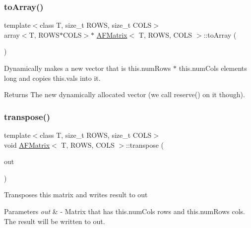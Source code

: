 \subsubsection{\texorpdfstring{to\+Array()}{toArray()}}
{\footnotesize\ttfamily template$<$class T, size\+\_\+t R\+O\+WS, size\+\_\+t C\+O\+LS$>$ \\
array$<$T, R\+O\+WS$\ast$C\+O\+LS$>$$\ast$ \hyperlink{class_a_f_matrix}{A\+F\+Matrix}$<$ T, R\+O\+WS, C\+O\+LS $>$\+::to\+Array (\begin{DoxyParamCaption}{ }\end{DoxyParamCaption})\hspace{0.3cm}{\ttfamily [inline]}}

Dynamically makes a new vector that is {\ttfamily this.\+num\+Rows $\ast$ this.\+num\+Cols} elements long and copies {\ttfamily this.\+vals} into it. \begin{DoxyReturn}{Returns}
The new dynamically allocated vector (we call {\ttfamily reserve()} on it though). 
\end{DoxyReturn}
\mbox{\label{class_a_f_matrix_ae087fb4a064d256eac51513863b06fa2}} 
\subsubsection{\texorpdfstring{transpose()}{transpose()}\hspace{0.1cm}{\footnotesize\ttfamily [1/2]}}
{\footnotesize\ttfamily template$<$class T, size\+\_\+t R\+O\+WS, size\+\_\+t C\+O\+LS$>$ \\
void \hyperlink{class_a_f_matrix}{A\+F\+Matrix}$<$ T, R\+O\+WS, C\+O\+LS $>$\+::transpose (\begin{DoxyParamCaption}\item[{\hyperlink{class_a_f_matrix}{A\+F\+Matrix}$<$ T, C\+O\+LS, R\+O\+WS $>$ $\ast$}]{out }\end{DoxyParamCaption})\hspace{0.3cm}{\ttfamily [inline]}}

Transposes this matrix and writes result to out 
\begin{DoxyParams}{Parameters}
{\em out} & -\/ Matrix that has this.\+num\+Cols rows and this.\+num\+Rows cols. The result will be written to out. \\
\hline
\end{DoxyParams}
\mbox{\label{class_a_f_matrix_a5f20b3ee2b16cbb9b9b39215a81d3aa1}} 
